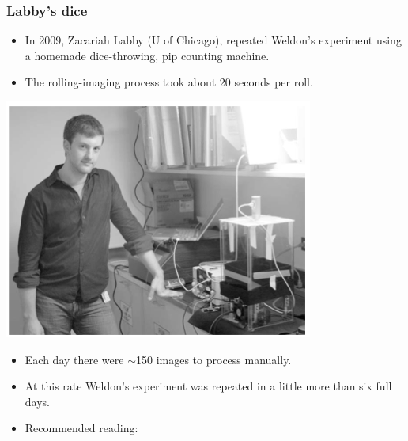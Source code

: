 \documentclass[notes,11pt, aspectratio=169]{beamer}
\begin{document}

\begin{frame}
\frametitle{Labby's dice}

{
\begin{itemize}

\item In 2009, Zacariah Labby (U of Chicago), repeated Weldon's experiment using a homemade dice-throwing, pip counting machine.
\begin{center}
\end{center}

\item The rolling-imaging process took about 20 seconds per roll.

\end{itemize}
}
{
\begin{center}
\includegraphics[width=\textwidth]{graphs/labby}
\end{center}
}

\begin{itemize}

\item Each day there were $\sim$150 images to process manually.

\item At this rate Weldon's experiment was repeated in a little more than six full days.

\item Recommended reading: 

\end{itemize}

\end{frame}
\end{document}
